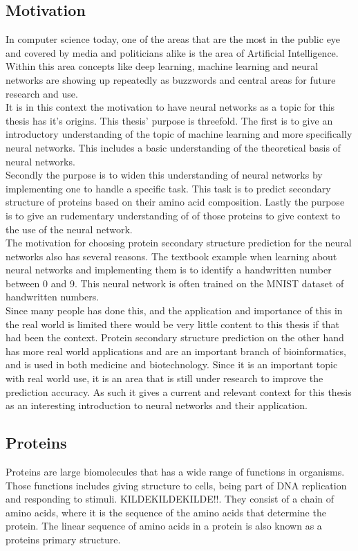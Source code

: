\subsection{Motivation}
In computer science today, one of the areas that are the most in the public eye and covered by media and politicians alike is the area of Artificial Intelligence. Within this area concepts like deep learning, machine learning and neural networks are showing up repeatedly as buzzwords and central areas for future research and use.\\
It is in this context the motivation to have neural networks as a topic for this thesis has it's origins. This thesis' purpose is threefold. The first is to give an introductory understanding of the topic of machine learning and more specifically neural networks. This includes a basic understanding of the theoretical basis of neural networks. \\
Secondly the purpose is to widen this understanding of neural networks by implementing one to handle a specific task. This task is to predict secondary structure of proteins based on their amino acid composition. Lastly the purpose is to give an rudementary understanding of of those proteins to give context to the use of the neural network.\\
The motivation for choosing protein secondary structure prediction for the neural networks also has several reasons. 
The textbook example when learning about neural networks and implementing them is to identify a handwritten number between 0 and 9. This neural network is often trained on the MNIST dataset of handwritten numbers. \\
Since many people has done this, and the application and importance of this in the real world is limited there would be very little content to this thesis if that had been the context. Protein secondary structure prediction on the other hand has more real world applications and are an important branch of bioinformatics, and is used in both medicine and biotechnology. Since it is an important topic with real world use, it is an area that is still under research to improve the prediction accuracy. As such it gives a current and relevant context for this thesis as an interesting introduction to neural networks and their application.   


\subsection{Proteins}
Proteins are large biomolecules that has a wide range of functions in organisms. Those functions includes giving structure to cells, being part of DNA replication and responding to stimuli. KILDEKILDEKILDE!!. They consist of a chain of amino acids, where it is the sequence of the amino acids that determine the protein. The linear sequence of amino acids in a protein is also known as a proteins primary structure. 

